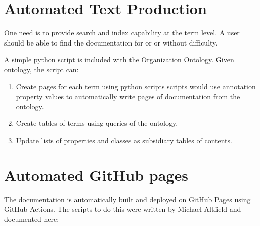 \documentclass[letterpaper,10pt,english]{sphinxmanual}
\begin{document}
\section{Automated Text Production}
\label{\detokenize{documentation-authors:automated-text-production}}
\sphinxAtStartPar
One need is to provide search and index capability at the term level. A
user should be able to find the documentation for  or  or
 without difficulty.

\sphinxAtStartPar
A simple python script  is included with the Organization
Ontology.  Given  ontology, the script can:
\begin{enumerate}
%
\item {} 
\sphinxAtStartPar
Create pages for each term using python scripts \textendash{} scripts would use annotation
property values to automatically write pages of documentation from the ontology.

\item {} 
\sphinxAtStartPar
Create tables of terms using queries of the ontology.

\item {} 
\sphinxAtStartPar
Update lists of properties and classes as subsidiary tables of contents.

\end{enumerate}


\section{Automated GitHub pages}
\label{\detokenize{documentation-authors:automated-github-pages}}
\sphinxAtStartPar
The documentation is automatically built and deployed on GitHub Pages using GitHub
Actions.  The scripts to do this were written by Michael Altfield and
documented here: 
\end{document}
